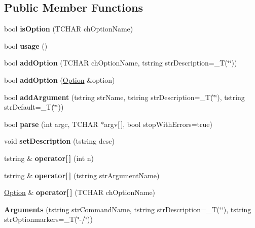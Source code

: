 \subsection*{Public Member Functions}
\begin{DoxyCompactItemize}
\item 
\mbox{\label{classArguments_a606a2390080ac2130bb04a9625b262f9}} 
bool {\bfseries is\+Option} (T\+C\+H\+AR ch\+Option\+Name)
\item 
\mbox{\label{classArguments_a255619dfd905699c2736d80b53e34e0a}} 
bool {\bfseries usage} ()
\item 
\mbox{\label{classArguments_a52ee036641dc209e97bf1a0915f771f2}} 
bool {\bfseries add\+Option} (T\+C\+H\+AR ch\+Option\+Name, tstring str\+Description=\+\_\+T(\char`\"{}\char`\"{}))
\item 
\mbox{\label{classArguments_a8cc8b5468b0c6f8da482df2fd5aa89f3}} 
bool {\bfseries add\+Option} (\hyperlink{classArguments_1_1Option}{Option} \&option)
\item 
\mbox{\label{classArguments_a220d65e34c94f3ac46c8a228b0617a9c}} 
bool {\bfseries add\+Argument} (tstring str\+Name, tstring str\+Description=\+\_\+T(\char`\"{}\char`\"{}), tstring str\+Default=\+\_\+T(\char`\"{}\char`\"{}))
\item 
\mbox{\label{classArguments_a4896d0a63a43b8eeba25167989341a33}} 
bool {\bfseries parse} (int argc, T\+C\+H\+AR $\ast$argv\mbox{[}$\,$\mbox{]}, bool stop\+With\+Errors=true)
\item 
\mbox{\label{classArguments_a2fa3a4276b81ede1b9d7fb48d3b1e6fe}} 
void {\bfseries set\+Description} (tstring desc)
\item 
\mbox{\label{classArguments_a5be695c6c17e6bbce1167ed87503b383}} 
tstring \& {\bfseries operator\mbox{[}$\,$\mbox{]}} (int n)
\item 
\mbox{\label{classArguments_a922f926f2b10c121a3edd31f02917270}} 
tstring \& {\bfseries operator\mbox{[}$\,$\mbox{]}} (tstring str\+Argument\+Name)
\item 
\mbox{\label{classArguments_a9e4cd695fcc69931382edaa2d345b04e}} 
\hyperlink{classArguments_1_1Option}{Option} \& {\bfseries operator\mbox{[}$\,$\mbox{]}} (T\+C\+H\+AR ch\+Option\+Name)
\item 
\mbox{\label{classArguments_aded5ead61dda27d46587d4ca59c7a27e}} 
{\bfseries Arguments} (tstring str\+Command\+Name, tstring str\+Description=\+\_\+T(\char`\"{}\char`\"{}), tstring str\+Optionmarkers=\+\_\+T(\char`\"{}-\//\char`\"{}))
\end{DoxyCompactItemize}
